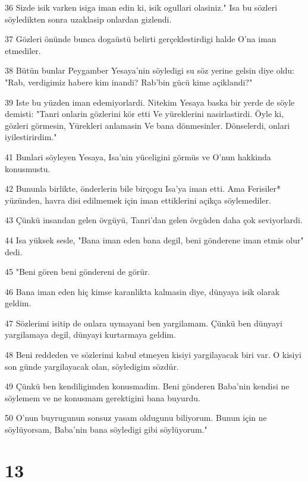 \par 36 Sizde isik varken isiga iman edin ki, isik ogullari olasiniz." Isa bu sözleri söyledikten sonra uzaklasip onlardan gizlendi.
\par 37 Gözleri önünde bunca dogaüstü belirti gerçeklestirdigi halde O'na iman etmediler.
\par 38 Bütün bunlar Peygamber Yesaya'nin söyledigi su söz yerine gelsin diye oldu: "Rab, verdigimiz habere kim inandi? Rab'bin gücü kime açiklandi?"
\par 39 Iste bu yüzden iman edemiyorlardi. Nitekim Yesaya baska bir yerde de söyle demisti: "Tanri onlarin gözlerini kör etti Ve yüreklerini nasirlastirdi. Öyle ki, gözleri görmesin, Yürekleri anlamasin Ve bana dönmesinler. Dönselerdi, onlari iyilestirirdim."
\par 41 Bunlari söyleyen Yesaya, Isa'nin yüceligini görmüs ve O'nun hakkinda konusmustu.
\par 42 Bununla birlikte, önderlerin bile birçogu Isa'ya iman etti. Ama Ferisiler* yüzünden, havra disi edilmemek için iman ettiklerini açikça söylemediler.
\par 43 Çünkü insandan gelen övgüyü, Tanri'dan gelen övgüden daha çok seviyorlardi.
\par 44 Isa yüksek sesle, "Bana iman eden bana degil, beni gönderene iman etmis olur" dedi.
\par 45 "Beni gören beni göndereni de görür.
\par 46 Bana iman eden hiç kimse karanlikta kalmasin diye, dünyaya isik olarak geldim.
\par 47 Sözlerimi isitip de onlara uymayani ben yargilamam. Çünkü ben dünyayi yargilamaya degil, dünyayi kurtarmaya geldim.
\par 48 Beni reddeden ve sözlerimi kabul etmeyen kisiyi yargilayacak biri var. O kisiyi son günde yargilayacak olan, söyledigim sözdür.
\par 49 Çünkü ben kendiligimden konusmadim. Beni gönderen Baba'nin kendisi ne söylemem ve ne konusmam gerektigini bana buyurdu.
\par 50 O'nun buyrugunun sonsuz yasam oldugunu biliyorum. Bunun için ne söylüyorsam, Baba'nin bana söyledigi gibi söylüyorum."

\chapter{13}

